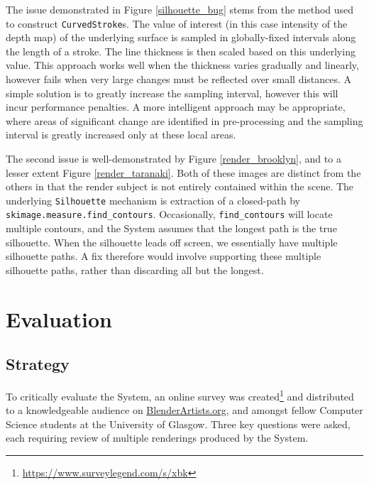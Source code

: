 The issue demonstrated in Figure \ref{silhouette_bug} stems from the method used to construct \texttt{CurvedStroke}s. The value of interest (in this case intensity of the depth map) of the underlying surface is sampled in globally-fixed intervals along the length of a stroke. The line thickness is then scaled based on this underlying value.
This approach works well when the thickness varies gradually and linearly, however fails when very large changes must be reflected over small distances.
A simple solution is to greatly increase the sampling interval, however this will incur performance penalties.
A more intelligent approach may be appropriate, where areas of significant change are identified in pre-processing and the sampling interval is greatly increased only at these local areas.

The second issue is well-demonstrated by Figure \ref{render_brooklyn}, and to a lesser extent Figure \ref{render_taranaki}.
Both of these images are distinct from the others in that the render subject is not entirely contained within the scene.
The underlying \texttt{Silhouette} mechanism is extraction of a closed-path by \texttt{skimage.measure.find\_contours}.
Occasionally, \texttt{find\_contours} will locate multiple contours, and the System assumes that the longest path is the true silhouette.
When the silhouette leads off screen, we essentially have multiple silhouette paths.
A fix therefore would involve supporting these multiple silhouette paths, rather than discarding all but the longest.

\section{Evaluation}

\subsection{Strategy}

To critically evaluate the System, an online survey was created\footnote{\url{https://www.surveylegend.com/s/xbk}} and distributed to a knowledgeable audience on \url{BlenderArtists.org}, and amongst fellow Computer Science students at the University of Glasgow.
Three key questions were asked, each requiring review of multiple renderings produced by the System.

